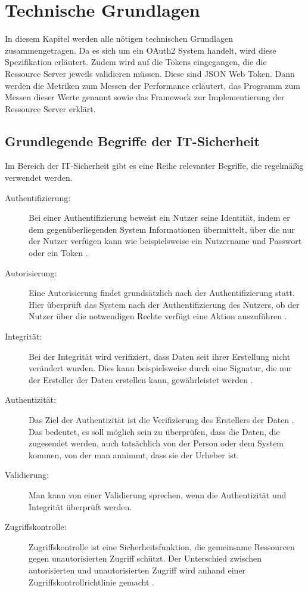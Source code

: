 \chapter{Technische Grundlagen}
\label{sec:TechnischeGrundlagen}
In diesem Kapitel werden alle nötigen technischen Grundlagen zusammengetragen. Da es sich um ein OAuth2 System handelt, wird diese Spezifikation erläutert. Zudem wird auf die Tokens eingegangen, die die Ressource Server jeweils validieren müssen. Diese sind \ac{JSON} Web Token. Dann werden die Metriken zum Messen der Performance erläutert, das Programm zum Messen dieser Werte genannt sowie das Framework zur Implementierung der Ressource Server erklärt. 

%
%
\section{Grundlegende Begriffe der IT-Sicherheit}
\label{sec:GrundlegenderBegriffederIT-Sicherheit}
Im Bereich der IT-Sicherheit gibt es eine Reihe relevanter Begriffe, die regelmäßig verwendet werden.

\begin{description}
  \item[Authentifizierung:] Bei einer Authentifizierung beweist ein Nutzer seine Identität, indem er dem gegenüberliegenden System Informationen übermittelt, über die nur der Nutzer verfügen kann wie beispielsweise ein Nutzername und Passwort oder ein Token \citep{Cankaya2011}.
  \item[Autorisierung:] Eine Autorisierung findet grundsätzlich nach der Authentifizierung statt. Hier überprüft das System nach der Authentifizierung des Nutzers, ob der Nutzer über die notwendigen Rechte verfügt eine Aktion auszuführen \citep{Authorization2011}. 
  \item[Integrität:] Bei der Integrität wird verifiziert, dass Daten seit ihrer Erstellung nicht verändert wurden. Dies kann beispielsweise durch eine Signatur, die nur der Ersteller der Daten erstellen kann, gewährleistet werden \citep{connect2id:2021}.
  \item[Authentizität:] Das Ziel der Authentizität ist die Verifizierung des Erstellers der Daten \citep{connect2id:2021}. Das bedeutet, es soll möglich sein zu überprüfen, dass die Daten, die zugesendet werden, auch tatsächlich von der Person oder dem System kommen, von der man annimmt, dass sie der Urheber ist.
  \item[Validierung:] Man kann von einer Validierung sprechen, wenn die Authentizität und Integrität überprüft werden.
  \item[Zugriffskontrolle:] Zugriffskontrolle ist eine Sicherheitsfunktion, die gemeinsame Ressourcen gegen unautorisierten Zugriff schützt. Der Unterschied zwischen autorisierten und unautorisierten Zugriff wird anhand einer Zugriffskontrollrichtlinie gemacht \citep{Brose2011}. 
\end{description}

